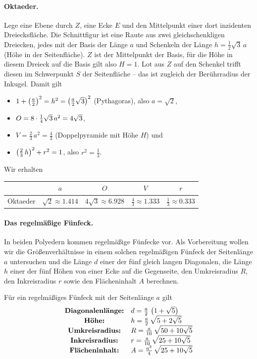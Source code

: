 \documentclass[11pt]{article}
\begin{document}
\paragraph{Oktaeder.}
Lege eine Ebene durch $Z$, eine Ecke $E$ und den Mittelpunkt einer dort
inzidenten Dreiecksfläche. Die Schnittfigur ist eine Raute aus zwei
gleichschenkligen Dreiecken, jedes mit der Basis der Länge $a$ und Schenkeln
der Länge $h=\frac12\sqrt{3}\,a$ (Höhe in der Seitenfläche). $Z$ ist der
Mittelpunkt der Basis, für die Höhe in diesem Dreieck auf die Basis gilt also
$H=1$.  Lot aus $Z$ auf den Schenkel trifft diesen im Schwerpunkt $S$ der
Seitenfläche -- das ist zugleich der Berührradius der Inkugel. Damit gilt
\newpage
\begin{itemize}
\item $1+\left(\frac{a}{2}\right)^2=h^2=\left(\frac{a}{2}\sqrt{3}\right)^2$ (Pythagoras), also
  $a=\sqrt{2}$,
\item $O=8\cdot\frac14\sqrt{3}\,a^2=4\sqrt{3}$, 
\item $V=\frac23\,a^2=\frac43$ (Doppelpyramide mit Höhe $H$) und 
\item $\left(\frac23\,h\right)^2+r^2=1$, also $r^2=\frac13$.
\end{itemize}
Wir erhalten 
\begin{center}
  \begin{tabular}{|l|c|c|c|c|}\hline
    & $a$ & $O$ & $V$ & $r$ \\\hline
    Oktaeder & $\sqrt{2}\approx 1.414$ & $4\sqrt{3}\approx 6.928$ &
    $\frac43 \approx 1.333$ & $\frac13 \approx 0.333$ \\\hline
  \end{tabular}
\end{center}

\paragraph{Das regelmäßige Fünfeck.}
In beiden Polyedern kommen regelmäßige Fünfecke vor. Als Vorbereitung wollen
wir die Größenverhältnisse in einem solchen regelmäßigen Fünfeck der
Seitenlänge $a$ untersuchen und die Länge $d$ einer der fünf gleich langen
Diagonalen, die Länge $h$ einer der fünf Höhen von einer Ecke auf die
Gegenseite, den Umkreisradius $R$, den Inkreisradius $r$ sowie den
Flächeninhalt $A$ berechnen.

\begin{satz}
  Für ein regelmäßiges Fünfeck mit der Seitenlänge $a$ gilt
  \begin{gather*}
    \begin{array}{cl}    
      \text{\bf Diagonalenlänge:} & d=\frac{a}{2}\,\left(1+\sqrt{5}\right)\\
      \text{\bf Höhe:} & h=\frac{a}{2}\,\sqrt{5+2\sqrt{5}}\\
      \text{\bf Umkreisradius:} & R=\frac{a}{10}\,\sqrt{50+10\sqrt{5}}\\
      \text{\bf Inkreisradius:} & r=\frac{a}{10}\,\sqrt{25+10\sqrt{5}}\\
      \text{\bf Flächeninhalt:} & A=\frac{a^2}{4}\,\sqrt{25+10\sqrt{5}}
    \end{array}
  \end{gather*}
\end{satz}
\end{document}
